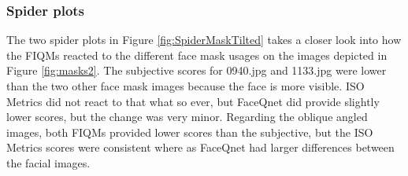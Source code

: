 \subsubsection{Spider plots}

The two spider plots in Figure \ref{fig:SpiderMaskTilted} takes a closer look into how the FIQMs reacted to the different face mask usages on the images depicted in Figure \ref{fig:masks2}. The subjective scores for 0940.jpg and 1133.jpg were lower than the two other face mask images because the face is more visible. ISO Metrics did not react to that what so ever, but FaceQnet did provide slightly lower scores, but the change was very minor. Regarding the oblique angled images, both FIQMs provided lower scores than the subjective, but the ISO Metrics scores were consistent where as FaceQnet had larger differences between the facial images.

